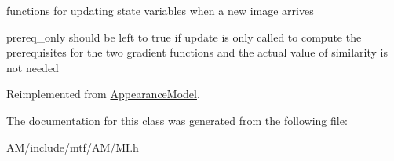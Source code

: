 functions for updating state variables when a new image arrives 

prereq\-\_\-only should be left to true if update is only called to compute the prerequisites for the two gradient functions and the actual value of similarity is not needed 

Reimplemented from \hyperlink{classAppearanceModel_a06136ecd903e85ed2007da2c7b12bd58}{Appearance\-Model}.



The documentation for this class was generated from the following file\-:\begin{DoxyCompactItemize}
\item 
A\-M/include/mtf/\-A\-M/M\-I.\-h\end{DoxyCompactItemize}

